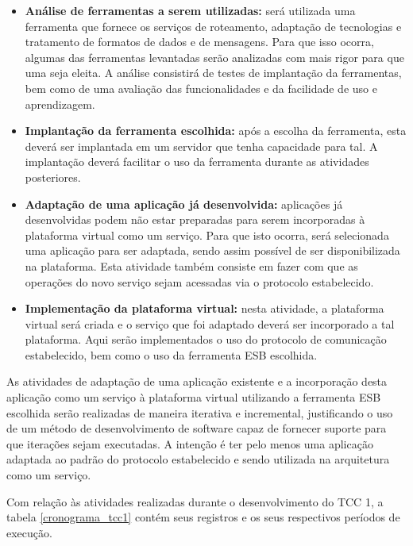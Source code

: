 \begin{itemize}
\item \textbf{Análise de ferramentas a serem utilizadas:} será utilizada uma ferramenta que fornece os serviços de roteamento, adaptação de tecnologias e tratamento de formatos de dados e de mensagens. Para que isso ocorra, algumas das ferramentas levantadas serão analizadas com mais rigor para que uma seja eleita. A análise consistirá de testes de implantação da ferramentas, bem como de uma avaliação das funcionalidades e da facilidade de uso e aprendizagem.
\item \textbf{Implantação da ferramenta escolhida:} após a escolha da ferramenta, esta deverá ser implantada em um servidor que tenha capacidade para tal. A implantação deverá facilitar o uso da ferramenta durante as atividades posteriores.
\item \textbf{Adaptação de uma aplicação já desenvolvida:} aplicações já desenvolvidas podem não estar preparadas para serem incorporadas à plataforma virtual como um serviço. Para que isto ocorra, será selecionada uma aplicação para ser adaptada, sendo assim possível de ser disponibilizada na plataforma. Esta atividade também consiste em fazer com que as operações do novo serviço sejam acessadas via o protocolo estabelecido.
\item \textbf{Implementação da plataforma virtual:} nesta atividade, a plataforma virtual será criada e o serviço que foi adaptado deverá ser incorporado a tal plataforma. Aqui serão implementados o uso do protocolo de comunicação estabelecido, bem como o uso da ferramenta ESB escolhida.
\end{itemize}

As atividades de adaptação de uma aplicação existente e a incorporação desta aplicação como um serviço à plataforma virtual utilizando a ferramenta ESB escolhida serão realizadas de maneira iterativa e incremental, justificando o uso de um método de desenvolvimento de software capaz de fornecer suporte para que iterações sejam executadas. A intenção é ter pelo menos uma aplicação adaptada ao padrão do protocolo estabelecido e sendo utilizada na arquitetura como um serviço.

Com relação às atividades realizadas durante o desenvolvimento do TCC 1, a tabela \ref{cronograma_tcc1} contém seus registros e os seus respectivos períodos de execução.


